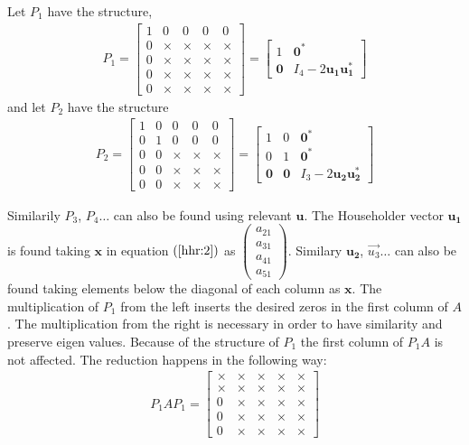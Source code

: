 \documentclass[12pt]{article}
\newcommand{\vecb}[1]{\mathbf{#1}}
\newcommand{\brak}[1]{\ensuremath{\left(#1\right)}}
\begin{document}
Let $P_1$ have the structure,
\begin{align}
P_1 = \begin{bmatrix}
1 & 0 & 0 & 0 & 0\\    
0 & \times & \times & \times & \times\\
0 & \times & \times & \times & \times\\
0 & \times & \times & \times & \times\\
0 & \times & \times & \times & \times
\end{bmatrix} = \begin{bmatrix}
1 & \vecb{0}^{\ast}\\    
\vecb{0} & I_4 - 2\vecb{u_1}\vecb{u_1^{\ast}}
\end{bmatrix}
\end{align}
and let $P_2$ have the structure
\begin{align}
P_2 = \begin{bmatrix}
1 & 0 & 0 & 0 & 0\\    
0 & 1 & 0 & 0 & 0\\
0 & 0 & \times & \times & \times\\
0 & 0 & \times & \times & \times\\
0 & 0 & \times & \times & \times
\end{bmatrix} = \begin{bmatrix}
1 & 0 & \vecb{0}^{\ast}\\    
0 & 1 & \vecb{0}^{\ast}\\
\vecb{0} & \vecb{0} & I_3 - 2\vecb{u_2}\vecb{u_2^{\ast}}
\end{bmatrix}
\end{align}

Similarily $P_3$, $P_4 \dots$ can also be found using relevant $\vecb{u}$.
The Householder vector $\vecb{u_1}$ is found taking $\vecb{x}$ in equation \brak{\ref{hhr:2}} as $\begin{pmatrix}a_{21}\\a_{31}\\a_{41}\\a_{51}\end{pmatrix}$.
\newline
Similary $\vecb{u_2}$, $\vec{u_3} \dots$ can also be found taking elements below the diagonal of each column as $\vecb{x}$.
\newline
The multiplication of $P_1$ from the left inserts the desired zeros in the first column of $A$. The multiplication from the right is necessary in order to have similarity and preserve eigen values.
Because of the structure of $P_1$ the first column of $P_1 A$ is not affected.
The reduction happens in the following way:
\begin{align}
P_1 A P_1 = \begin{bmatrix}
\times & \times & \times & \times & \times\\
\times & \times & \times & \times & \times\\
0 & \times & \times & \times & \times\\
0 & \times & \times & \times & \times\\
0 & \times & \times & \times & \times
\end{bmatrix} 
\end{align}
\end{document}
